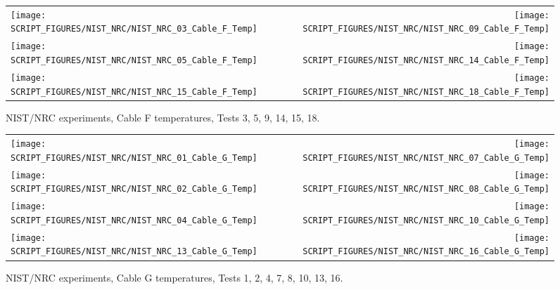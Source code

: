 \begin{figure}[p]
\begin{tabular*}{\textwidth}{l@{\extracolsep{\fill}}r}
\texttt{[image: SCRIPT\_FIGURES/NIST\_NRC/NIST\_NRC\_03\_Cable\_F\_Temp]} &
\texttt{[image: SCRIPT\_FIGURES/NIST\_NRC/NIST\_NRC\_09\_Cable\_F\_Temp]} \\
\texttt{[image: SCRIPT\_FIGURES/NIST\_NRC/NIST\_NRC\_05\_Cable\_F\_Temp]} &
\texttt{[image: SCRIPT\_FIGURES/NIST\_NRC/NIST\_NRC\_14\_Cable\_F\_Temp]} \\
\texttt{[image: SCRIPT\_FIGURES/NIST\_NRC/NIST\_NRC\_15\_Cable\_F\_Temp]} &
\texttt{[image: SCRIPT\_FIGURES/NIST\_NRC/NIST\_NRC\_18\_Cable\_F\_Temp]}
\end{tabular*}
\caption[NIST/NRC experiments, Cable F temperatures, Tests 3, 5, 9, 14, 15, 18]{NIST/NRC experiments, Cable F temperatures, Tests 3, 5, 9, 14, 15, 18.}
\label{NIST_NRC_Cable_F_Open}
\end{figure}

\begin{figure}[p]
\begin{tabular*}{\textwidth}{l@{\extracolsep{\fill}}r}
\texttt{[image: SCRIPT\_FIGURES/NIST\_NRC/NIST\_NRC\_01\_Cable\_G\_Temp]} &
\texttt{[image: SCRIPT\_FIGURES/NIST\_NRC/NIST\_NRC\_07\_Cable\_G\_Temp]} \\
\texttt{[image: SCRIPT\_FIGURES/NIST\_NRC/NIST\_NRC\_02\_Cable\_G\_Temp]} &
\texttt{[image: SCRIPT\_FIGURES/NIST\_NRC/NIST\_NRC\_08\_Cable\_G\_Temp]} \\
\texttt{[image: SCRIPT\_FIGURES/NIST\_NRC/NIST\_NRC\_04\_Cable\_G\_Temp]} &
\texttt{[image: SCRIPT\_FIGURES/NIST\_NRC/NIST\_NRC\_10\_Cable\_G\_Temp]} \\
\texttt{[image: SCRIPT\_FIGURES/NIST\_NRC/NIST\_NRC\_13\_Cable\_G\_Temp]} &
\texttt{[image: SCRIPT\_FIGURES/NIST\_NRC/NIST\_NRC\_16\_Cable\_G\_Temp]}
\end{tabular*}
\caption[NIST/NRC experiments, Cable G temperatures, Tests 1, 2, 4, 7, 8, 10, 13, 16]{NIST/NRC experiments, Cable G temperatures, Tests 1, 2, 4, 7, 8, 10, 13, 16.}
\label{NIST_NRC_Cable_G_Closed}
\end{figure}

